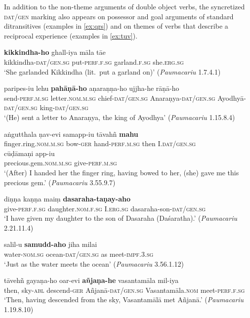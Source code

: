 \documentclass[output=paper,
modfonts
]{LSP/langsci}
\begin{document}
 In addition to the non-theme arguments of double object verbs, the syncretized \textsc{dat/gen}  marking also  appears on possessor and goal arguments of standard ditransitives (examples in \cref{ex:qrs}) and on themes of  verbs that describe a reciprocal experience (examples in \cref{ex:tuv}).  
\begin{exe}
\ex\label{ex:qrs}
\begin{xlist}
\ex\label{ex:kikkindhaho}\gll \textbf{kikkindha-ho} ghall-iya māla tāe \\
kikkindha-\textsc{dat/gen.sg} put-\textsc{perf.f.sg} garland.\textsc{f.sg} she.\textsc{erg.sg} \\
\glt `She garlanded Kikkindha (lit.\ put a garland on)' (\textit{Paumacariu} 1.7.4.1)

\ex\label{ex:paripesiu}\gll paripes-iu lehu \textbf{pahāṇā-ho}   aṇaraṇṇa-ho  ujjha-he rāṇā-ho \\
send-\textsc{perf.m.sg} letter.\textsc{nom.m.sg}  chief-\textsc{dat/gen.sg} Anaraṇya-\textsc{dat/gen.sg} Ayodhyā-\textsc{dat/gen.sg} king-\textsc{dat/gen.sg} \\
\glt `(He) sent a letter to  Anaraṇya, the king of Ayodhya' (\textit{Paumacariu} 1.15.8.4)

\ex\label{ex:angutthala}\gll aṅgutthala ṇav-evi samapp-iu   tāvahñ \textbf{mahu} \\
finger.ring.\textsc{nom.m.sg} bow-\textsc{ger} hand-\textsc{perf.m.sg} then  I.\textsc{dat/gen.sg}\\

\gll cūḍāmaṇi app-iu \\
precious.gem.\textsc{nom.m.sg} give-\textsc{perf.m.sg} \\
\glt `(After) I handed her the finger ring, having bowed to her, (she) gave me this precious gem.'   (\textit{Paumacariu} 3.55.9.7)

\ex\label{ex:dinna}\gll diṇṇa kaṇṇa maiṃ  \textbf{dasaraha-taṇay-aho} \\
give-\textsc{perf.f.sg} daughter.\textsc{nom.f.sg} I.\textsc{erg.sg} dasaraha-son-\textsc{dat/gen.sg} \\
\glt `I have given my daughter to the son of Dasaraha (Daśaratha).' (\textit{Paumacariu} 2.21.11.4)
\end{xlist}

\ex\label{ex:tuv}
\begin{xlist}
\ex\label{ex:salilu}\gll salil-u \textbf{samudd-aho} jiha milai \\ water-\textsc{nom.sg} ocean-\textsc{dat/gen.sg} as meet-\textsc{impf.3.sg} \\
\glt `Just as the water meets the ocean' (\textit{Paumacariu} 3.56.1.12)

\ex\label{ex:tavehn}\gll tāvehñ gayaṇa-ho oar-evi  \textbf{añjaṇa-he} vasantamāla mil-iya \\
then, sky-\textsc{abl} descend-\textsc{ger}  Añjanā-\textsc{dat/gen.sg} Vasantamāla.\textsc{nom} meet-\textsc{perf.f.sg} \\
\glt `Then, having descended from the sky, Vasantamālā met Añjanā.' (\textit{Paumacariu} 1.19.8.10)
\end{xlist}
\end{exe}
\end{document}
